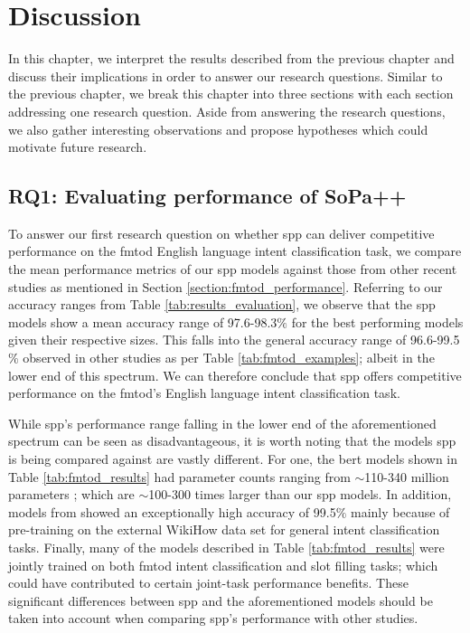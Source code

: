 \chapter{Discussion}

\label{chapter:discussion}

In this chapter, we interpret the results described from the previous chapter
and discuss their implications in order to answer our research questions.
Similar to the previous chapter, we break this chapter into three sections with
each section addressing one research question. Aside from answering the research
questions, we also gather interesting observations and propose hypotheses which could
motivate future research.

\section{RQ1: Evaluating performance of SoPa++}

To answer our first research question on whether \ac{spp} can deliver competitive
performance on the \ac{fmtod} English language intent classification task, we compare
the mean performance metrics of our \ac{spp} models against those from other
recent studies as mentioned in Section \ref{section:fmtod_performance}.
Referring to our accuracy ranges from Table \ref{tab:results_evaluation}, we
observe that the \ac{spp} models show a mean accuracy range of 97.6-98.3$\%$ for the
best performing models given their respective sizes. This falls into the general
accuracy range of 96.6-99.5$\%$ observed in other studies as per Table
\ref{tab:fmtod_examples}; albeit in the lower end of this spectrum. We can
therefore conclude that \ac{spp} offers competitive performance on the \ac{fmtod}'s
English language intent classification task.

While \ac{spp}'s performance range falling in the lower end of the aforementioned
spectrum can be seen as disadvantageous, it is worth noting that the models
\ac{spp} is being compared against are vastly different. For one, the \ac{bert}
models shown in Table \ref{tab:fmtod_results} had parameter counts ranging from
$\sim$110-340 million parameters \citep{devlin-etal-2019-bert}; which are
$\sim$100-300 times larger than our \ac{spp} models. In addition, models from
\citet{zhang-etal-2020-intent} showed an exceptionally high accuracy of 99.5$\%$
mainly because of pre-training on the external WikiHow data set for general
intent classification tasks. Finally, many of the models described in Table
\ref{tab:fmtod_results} were jointly trained on both \ac{fmtod} intent classification
and slot filling tasks; which could have contributed to certain joint-task
performance benefits. These significant differences between \ac{spp} and the
aforementioned models should be taken into account when comparing \ac{spp}'s
performance with other studies. 

